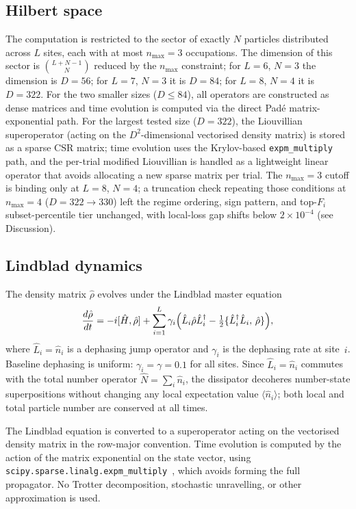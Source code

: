 \documentclass[aps,prresearch,reprint,amsmath,amssymb,longbibliography,floatfix]{revtex4-2}
\newcommand{\Fi}{F_i}
\newcommand{\nop}{\hat{n}}
\newcommand{\rhohat}{\hat{\rho}}
\newcommand{\Lop}{\hat{L}}
\begin{document}
\subsection{Hilbert space}

The computation is restricted to the sector of exactly $N$ particles
distributed across $L$ sites, each with at most $n_{\max}=3$ occupations.
The dimension of this sector is $\binom{L+N-1}{N}$ reduced by the
$n_{\max}$ constraint; for $L=6$, $N=3$ the dimension is $D=56$; for
$L=7$, $N=3$ it is $D=84$; for $L=8$, $N=4$ it is $D=322$.
For the two smaller sizes ($D\leq84$), all operators are constructed as
dense matrices and time evolution is computed via the direct Pad\'{e}
matrix-exponential path.
For the largest tested size ($D=322$), the Liouvillian superoperator
(acting on the $D^2$-dimensional vectorised density matrix) is stored as
a sparse CSR matrix; time evolution uses the Krylov-based
\texttt{expm\_multiply} path, and the per-trial modified Liouvillian
is handled as a lightweight linear operator that avoids allocating a
new sparse matrix per trial.
The $n_{\max}=3$ cutoff is binding only at $L=8$, $N=4$; a truncation
check repeating those conditions at $n_{\max}=4$ ($D=322\to330$) left
the regime ordering, sign pattern, and top-$\Fi$ subset-percentile tier
unchanged, with local-loss gap shifts below $2\times10^{-4}$
(see Discussion).

\subsection{Lindblad dynamics}

The density matrix $\rhohat$ evolves under the Lindblad master equation
\begin{equation}
\label{eq:lindblad}
\frac{d\rhohat}{dt} = -i[\hat{H},\rhohat]
  + \sum_{i=1}^{L} \gamma_i \Bigl(
    \Lop_i\rhohat\Lop_i^\dagger
    - \tfrac{1}{2}\{\Lop_i^\dagger\Lop_i,\,\rhohat\}
  \Bigr),
\end{equation}
where $\Lop_i = \nop_i$ is a dephasing jump operator and $\gamma_i$ is
the dephasing rate at site~$i$.
Baseline dephasing is uniform: $\gamma_i = \gamma = 0.1$ for all sites.
Since $\Lop_i = \nop_i$ commutes with the total number operator $\hat{N} =
\sum_i \nop_i$, the dissipator decoheres number-state superpositions without
changing any local expectation value $\langle\nop_i\rangle$; both local and
total particle number are conserved at all times.

The Lindblad equation is converted to a superoperator acting on the
vectorised density matrix in the row-major convention.
Time evolution is computed by the action of the matrix exponential on
the state vector, using \texttt{scipy.sparse.linalg.expm\_multiply}~\cite{scipy2020},
which avoids forming the full propagator.
No Trotter decomposition, stochastic unravelling, or other approximation
is used.
\end{document}
